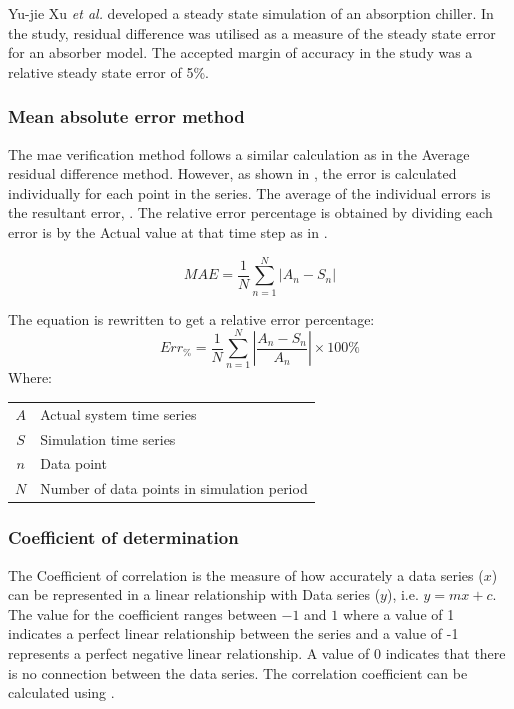  			Yu-jie Xu \textit{et al.} \cite{xu2016modeling} developed a steady state simulation of an absorption chiller. In the study, residual difference was utilised as a measure of the steady state error for an absorber model. The accepted margin of accuracy in the study was a relative steady state error of 5\%. 
 			
 		\subsubsection{Mean absolute error method}
 		The \gls{mae} verification method follows a similar calculation as in the Average residual difference method. However, as shown in , the error is calculated individually for each point in the series. The average of the individual errors is the resultant error, . The relative error percentage is obtained by dividing each error is by the Actual value at that time step as in .
 		\par
 		\begin{equation}
 		\label{eq: Relative error 2}
 		MAE = \dfrac{1}{N}\sum_{n=1}^{N}{\left|A_{n} - S_{n}\right| }
 		\end{equation}
 		
 			The equation is rewritten to get a relative error percentage:	
 			\begin{equation}
 			\label{eq: Relative error}
 			Err_{\%} = \dfrac{1}{N}\sum_{n=1}^{N}{\left|\dfrac{A_{n} - S_{n}}{A_{n}}\right| }\times 100 \%
 			\end{equation}
 			Where: \par
 			\begin{table}[!htbp]
 				\centering
 				\begin{tabular}{cl}
 					$A$ & Actual system time series \\
 					$S$ & Simulation time series \\
 					$n$ & Data point \\
 					$N$ & Number of data points in simulation period \\
 				\end{tabular} 
 			\end{table} 
 		\subsubsection{Coefficient of determination}
 		The Coefficient of correlation is the measure of how accurately a data series ($ x $) can be represented in a linear relationship with Data series ($ y $), i.e. $ y = mx+c$. The value for the coefficient ranges between $ -1 $ and $ 1 $ where a value of 1 indicates a perfect linear relationship between the series and a value of -1 represents a perfect negative linear relationship. A value of 0 indicates that there is no connection between the data series. The correlation coefficient can be calculated using  \cite{sarin2010comparing}.
 		
